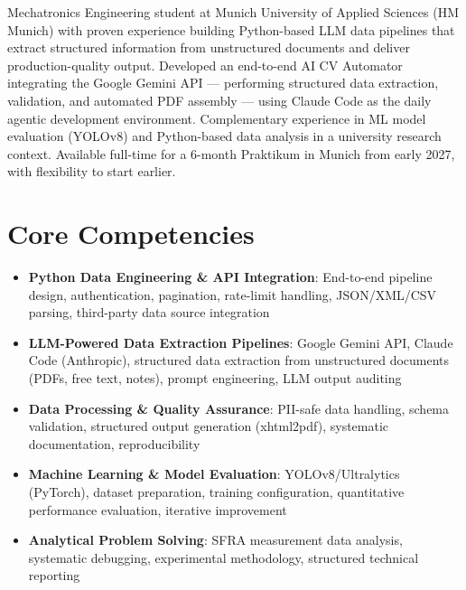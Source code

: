 \documentclass[11pt,a4paper,sans]{moderncv}
\begin{document}
\makecvtitle


\vspace{6pt}
\small{Mechatronics Engineering student at Munich University of Applied Sciences (HM Munich) with proven experience building Python-based LLM data pipelines that extract structured information from unstructured documents and deliver production-quality output. Developed an end-to-end AI CV Automator integrating the Google Gemini API --- performing structured data extraction, validation, and automated PDF assembly --- using Claude Code as the daily agentic development environment. Complementary experience in ML model evaluation (YOLOv8) and Python-based data analysis in a university research context. Available full-time for a 6-month Praktikum in Munich from early 2027, with flexibility to start earlier.}


\section{Core Competencies}
\vspace{1pt}
\begin{itemize}

\item \textbf{Python Data Engineering \& API Integration}: End-to-end pipeline design, authentication, pagination, rate-limit handling, JSON/XML/CSV parsing, third-party data source integration

\item \textbf{LLM-Powered Data Extraction Pipelines}: Google Gemini API, Claude Code (Anthropic), structured data extraction from unstructured documents (PDFs, free text, notes), prompt engineering, LLM output auditing

\item \textbf{Data Processing \& Quality Assurance}: PII-safe data handling, schema validation, structured output generation (xhtml2pdf), systematic documentation, reproducibility

\item \textbf{Machine Learning \& Model Evaluation}: YOLOv8/Ultralytics (PyTorch), dataset preparation, training configuration, quantitative performance evaluation, iterative improvement

\item \textbf{Analytical Problem Solving}: SFRA measurement data analysis, systematic debugging, experimental methodology, structured technical reporting

\end{itemize}
\end{document}
